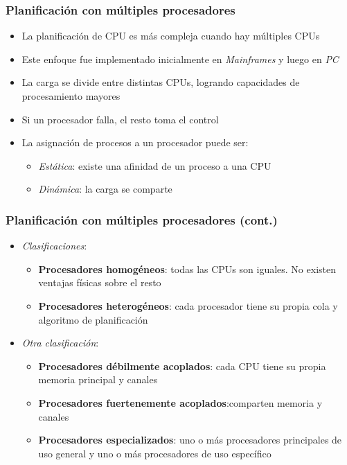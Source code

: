 \begin{frame}
  \frametitle{Planificación con múltiples procesadores}
	\begin{itemize}
		\item La planificación de CPU es más compleja cuando hay múltiples CPUs	
		\item Este enfoque fue implementado inicialmente en \textit{Mainframes} y luego en \textit{PC}
		\item La carga se divide entre distintas CPUs, logrando capacidades de procesamiento mayores
		\item Si un procesador falla, el resto toma el control
		\item La asignación de procesos a un procesador puede ser:
		\begin{itemize}
			\item \emph{Estática}: existe una afinidad de un proceso a una CPU
			\item \emph{Dinámica}: la carga se comparte
		\end{itemize}
	\end{itemize}
\end{frame}

\begin{frame}
  \frametitle{Planificación con múltiples procesadores (cont.)}
	\begin{itemize}		
		\item \emph{Clasificaciones}:
		\begin{itemize}
			\item \textbf{Procesadores homogéneos}: todas las CPUs son iguales. No existen ventajas físicas sobre el resto
			\item \textbf{Procesadores heterogéneos}: cada procesador tiene su propia cola y algoritmo de planificación
		\end{itemize}
		\item \emph{Otra clasificación}:
		\begin{itemize}
			\item \textbf{Procesadores débilmente acoplados}: cada CPU tiene su propia memoria principal y canales
			\item \textbf{Procesadores fuertenemente acoplados}:comparten memoria y canales
			\item \textbf{Procesadores especializados}: uno o más procesadores principales de uso general y uno o más procesadores de uso específico
		\end{itemize}		
	\end{itemize}
\end{frame}